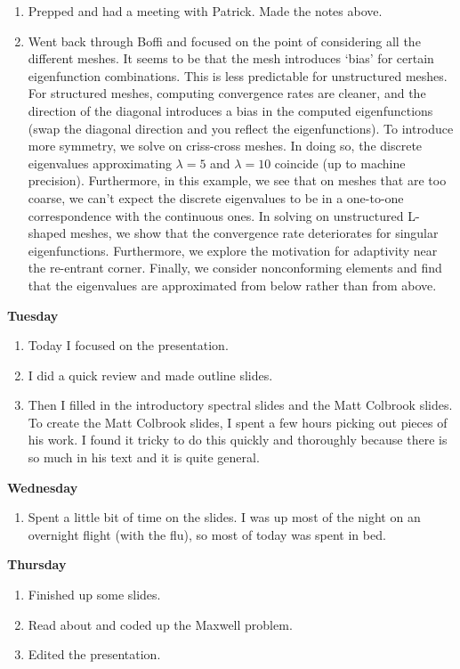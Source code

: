 \documentclass[12pt,a4paper]{article}
\begin{document}
\begin{enumerate}
    \item Prepped and had a meeting with Patrick. Made the notes above. 
    \item Went back through Boffi and focused on the point of considering all the different meshes. It seems to be that the mesh introduces `bias' for certain eigenfunction combinations. This is less predictable for unstructured meshes. For structured meshes, computing convergence rates are cleaner, and the direction of the diagonal introduces a bias in the computed eigenfunctions (swap the diagonal direction and you reflect the eigenfunctions). To introduce more symmetry, we solve on criss-cross meshes. In doing so, the discrete eigenvalues approximating $\lambda = 5$ and $\lambda = 10$ coincide (up to machine precision). Furthermore, in this example, we see that on meshes that are too coarse, we can't expect the discrete eigenvalues to be in a one-to-one correspondence with the continuous ones. In solving on unstructured L-shaped meshes, we show that the convergence rate deteriorates for singular eigenfunctions. Furthermore, we explore the motivation for adaptivity near the re-entrant corner. Finally, we consider nonconforming elements and find that the eigenvalues are approximated from below rather than from above.
    
\end{enumerate}

\textbf{Tuesday}
\begin{enumerate}
    \item Today I focused on the presentation.
    \item I did a quick review and made outline slides.
    \item Then I filled in the introductory spectral slides and the Matt Colbrook slides. To create the Matt Colbrook slides, I spent a few hours picking out pieces of his work. I found it tricky to do this quickly and thoroughly because there is so much in his text and it is quite general.
\end{enumerate}

\textbf{Wednesday}
\begin{enumerate}
    \item Spent a little bit of time on the slides. I was up most of the night on an overnight flight (with the flu), so most of today was spent in bed.
\end{enumerate}

\textbf{Thursday}
\begin{enumerate}
    \item Finished up some slides.
    \item Read about and coded up the Maxwell problem.
    \item Edited the presentation.
\end{enumerate}
\end{document}
